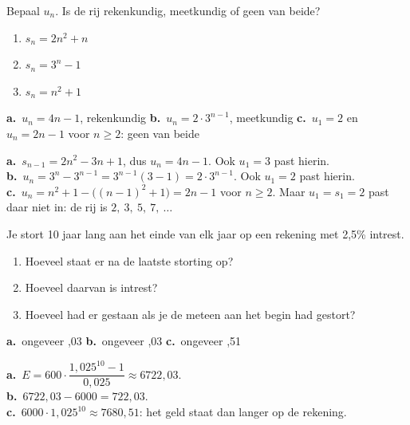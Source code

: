 \begin{oefeningen}
\begin{oefening}[2]\label{oef:h3-uitsom}
Bepaal $u_n$. Is de rij rekenkundig, meetkundig of geen van beide?
\begin{enumerate}
  \item $s_n = 2n^2 + n$
  \item $s_n = 3^n - 1$
  \item $s_n = n^2 + 1$
\end{enumerate}
\begin{solution}
\textbf{a.}~$u_n=4n-1$, rekenkundig \quad \textbf{b.}~$u_n=2\cdot 3^{n-1}$, meetkundig \quad \textbf{c.}~$u_1=2$ en $u_n=2n-1$ voor $n\geqslant 2$: geen van beide
\end{solution}
\begin{fullsolution}
\textbf{a.}~$s_{n-1}=2n^2-3n+1$, dus $u_n=4n-1$. Ook $u_1=3$ past hierin.\\
\textbf{b.}~$u_n=3^n-3^{n-1}=3^{n-1}(3-1)=2\cdot 3^{n-1}$. Ook $u_1=2$ past hierin.\\
\textbf{c.}~$u_n=n^2+1-\bigl((n-1)^2+1\bigr)=2n-1$ voor $n\geqslant 2$. Maar $u_1=s_1=2$ past daar niet in: de rij is $2,\ 3,\ 5,\ 7,\ \ldots$
\end{fullsolution}
\end{oefening}

\begin{oefening}[2]\label{oef:h3-sparen}
Je stort 10 jaar lang aan het einde van elk jaar  op een rekening met 2,5\% intrest.
\begin{enumerate}
  \item Hoeveel staat er na de laatste storting op?
  \item Hoeveel daarvan is intrest?
  \item Hoeveel had er gestaan als je de  meteen aan het begin had gestort?
\end{enumerate}
\begin{solution}
\textbf{a.}~ongeveer ,03 \quad \textbf{b.}~ongeveer ,03 \quad \textbf{c.}~ongeveer ,51
\end{solution}
\begin{fullsolution}
\textbf{a.}~$E=600\cdot\dfrac{1{,}025^{10}-1}{0{,}025}\approx 6722{,}03$.\\
\textbf{b.}~$6722{,}03-6000=722{,}03$.\\
\textbf{c.}~$6000\cdot 1{,}025^{10}\approx 7680{,}51$: het geld staat dan langer op de rekening.
\end{fullsolution}
\end{oefening}


\end{oefeningen}
